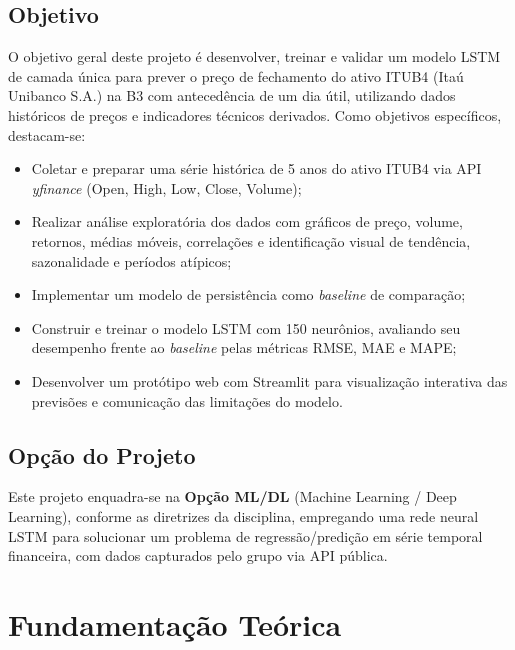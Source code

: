 \documentclass[12pt]{article}
\begin{document}
\subsection{Objetivo}

O objetivo geral deste projeto é desenvolver, treinar e validar um modelo
LSTM de camada única para prever o preço de fechamento do ativo ITUB4
(Itaú Unibanco S.A.) na B3 com antecedência de um dia útil, utilizando
dados históricos de preços e indicadores técnicos derivados. Como objetivos
específicos, destacam-se:

\begin{itemize}
  \item Coletar e preparar uma série histórica de 5 anos do ativo ITUB4
        via API \textit{yfinance} (Open, High, Low, Close, Volume);
  \item Realizar análise exploratória dos dados com gráficos de preço,
        volume, retornos, médias móveis, correlações e identificação visual
        de tendência, sazonalidade e períodos atípicos;
  \item Implementar um modelo de persistência como \textit{baseline} de
        comparação;
  \item Construir e treinar o modelo LSTM com 150 neurônios, avaliando seu
        desempenho frente ao \textit{baseline} pelas métricas RMSE, MAE
        e MAPE;
  \item Desenvolver um protótipo web com Streamlit para visualização
        interativa das previsões e comunicação das limitações do modelo.
\end{itemize}

\subsection{Opção do Projeto}

Este projeto enquadra-se na \textbf{Opção ML/DL} (Machine Learning / Deep
Learning), conforme as diretrizes da disciplina, empregando uma rede neural
LSTM para solucionar um problema de regressão/predição em série temporal
financeira, com dados capturados pelo grupo via API pública.


\section{Fundamentação Teórica}
\end{document}
